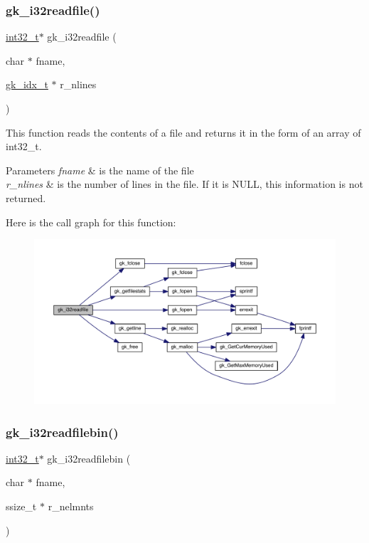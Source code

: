 \subsubsection{\texorpdfstring{gk\+\_\+i32readfile()}{gk\_i32readfile()}}
{\footnotesize\ttfamily \hyperlink{a00119_a37994e3b11c72957c6f454c6ec96d43d}{int32\+\_\+t}$\ast$ gk\+\_\+i32readfile (\begin{DoxyParamCaption}\item[{char $\ast$}]{fname,  }\item[{\hyperlink{a00083_a899f9d8c47b1ca0c2fead41097f4bde2}{gk\+\_\+idx\+\_\+t} $\ast$}]{r\+\_\+nlines }\end{DoxyParamCaption})}

This function reads the contents of a file and returns it in the form of an array of int32\+\_\+t. 
\begin{DoxyParams}{Parameters}
{\em fname} & is the name of the file \\
\hline
{\em r\+\_\+nlines} & is the number of lines in the file. If it is N\+U\+LL, this information is not returned. \\
\hline
\end{DoxyParams}
Here is the call graph for this function\+:\nopagebreak
\begin{figure}[H]
\begin{center}
\leavevmode
\includegraphics[width=350pt]{a00855_a201c46a9a2bf9c06a917f259d109b7ee_cgraph}
\end{center}
\end{figure}
\mbox{\label{a00855_afbb9b4e2327d298a79924028441a0fdb}} 
\subsubsection{\texorpdfstring{gk\+\_\+i32readfilebin()}{gk\_i32readfilebin()}}
{\footnotesize\ttfamily \hyperlink{a00119_a37994e3b11c72957c6f454c6ec96d43d}{int32\+\_\+t}$\ast$ gk\+\_\+i32readfilebin (\begin{DoxyParamCaption}\item[{char $\ast$}]{fname,  }\item[{ssize\+\_\+t $\ast$}]{r\+\_\+nelmnts }\end{DoxyParamCaption})}

